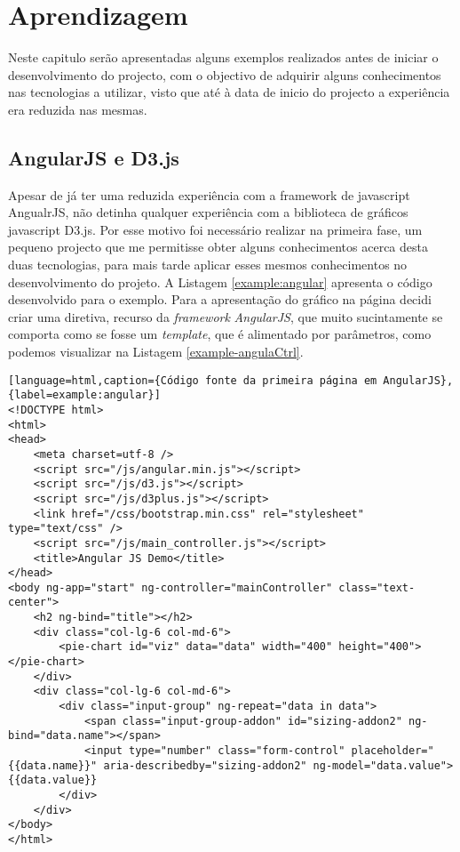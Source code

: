 \chapter{Aprendizagem}
\label{cap4}
\par Neste capitulo serão apresentadas alguns exemplos realizados antes de iniciar o desenvolvimento do projecto, com o objectivo de adquirir alguns conhecimentos nas tecnologias a utilizar, visto que até à data de inicio do projecto a experiência era reduzida nas mesmas.

\section{AngularJS e D3.js}
\par Apesar de já ter uma reduzida experiência com a framework de javascript AngualrJS, não detinha qualquer experiência com a biblioteca de gráficos javascript D3.js. Por esse motivo foi necessário realizar na primeira fase, um pequeno projecto que me permitisse obter alguns conhecimentos acerca desta duas tecnologias, para mais tarde aplicar esses mesmos conhecimentos no desenvolvimento do projeto. \newline
A Listagem \ref{example:angular} apresenta o código desenvolvido para o exemplo. Para a apresentação do gráfico na página decidi criar uma diretiva, recurso da \textit{framework} \textit{AngularJS}, que muito sucintamente se comporta como se fosse um \textit{template}, que é alimentado por parâmetros, como podemos visualizar na Listagem \ref{example-angulaCtrl}.
\begin{lstlisting}[language=html,caption={Código fonte da primeira página em AngularJS},{label=example:angular}]
<!DOCTYPE html>
<html>
<head>
    <meta charset=utf-8 />
    <script src="/js/angular.min.js"></script>
    <script src="/js/d3.js"></script>
    <script src="/js/d3plus.js"></script>
    <link href="/css/bootstrap.min.css" rel="stylesheet" type="text/css" />
    <script src="/js/main_controller.js"></script>
    <title>Angular JS Demo</title>
</head>
<body ng-app="start" ng-controller="mainController" class="text-center">
    <h2 ng-bind="title"></h2>
    <div class="col-lg-6 col-md-6">
        <pie-chart id="viz" data="data" width="400" height="400"></pie-chart>
    </div>
    <div class="col-lg-6 col-md-6">
        <div class="input-group" ng-repeat="data in data">
            <span class="input-group-addon" id="sizing-addon2" ng-bind="data.name"></span>
            <input type="number" class="form-control" placeholder="{{data.name}}" aria-describedby="sizing-addon2" ng-model="data.value">{{data.value}}
        </div>
    </div>
</body>
</html>
\end{lstlisting}

